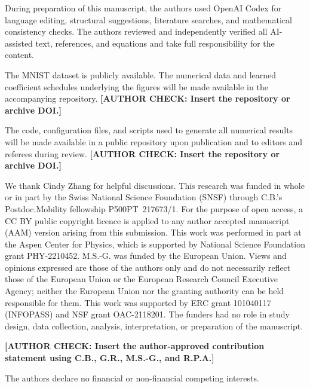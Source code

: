 \documentclass[referee,lineno,pdflatex,sn-nature]{sn-jnl}
\newcommand{\authorcheck}[1]{\textbf{[AUTHOR CHECK: #1]}}
\begin{document}
During preparation of this manuscript, the authors used OpenAI Codex for language
editing, structural suggestions, literature searches, and mathematical consistency
checks. The authors reviewed and independently verified all AI-assisted text,
references, and equations and take full responsibility for the content.

\backmatter


The MNIST dataset is publicly available. The numerical data and learned coefficient
schedules underlying the figures will be made available in the accompanying
repository.
\authorcheck{Insert the repository or archive DOI.}



The code, configuration files, and scripts used to generate all numerical results
will be made available in a public repository upon publication and to editors and
referees during review.
\authorcheck{Insert the repository or archive DOI.}


We thank Cindy Zhang for helpful discussions. This research was funded in whole or
in part by the Swiss National Science Foundation (SNSF) through C.B.'s
Postdoc.Mobility fellowship P500PT~217673/1. For the purpose of open access, a CC BY
public copyright licence is applied to any author accepted manuscript (AAM) version
arising from this submission.
This work was performed in part at the Aspen Center for Physics, which is supported
by National Science Foundation grant
PHY-2210452. M.S.-G. was funded by the European Union. Views and opinions expressed
are those of the authors only and do not necessarily reflect those of the European
Union or the European Research Council Executive Agency; neither the European Union
nor the granting authority can be held responsible for them. This work was supported
by ERC grant 101040117 (INFOPASS) and NSF grant OAC-2118201. The funders had no
role in study design, data collection, analysis, interpretation, or preparation of
the manuscript.


\authorcheck{Insert the author-approved contribution statement using C.B., G.R.,
M.S.-G., and R.P.A.}


The authors declare no financial or non-financial competing interests.


\end{document}
